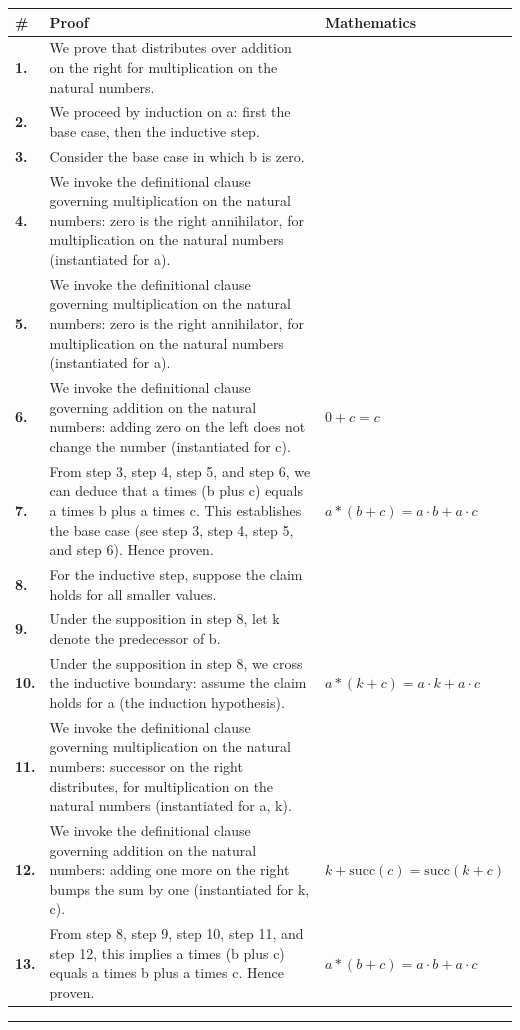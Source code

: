 \documentclass[11pt]{article}
\theoremstyle{definition}
\begin{document}
\begin{tabular}{@{} >{\raggedright\arraybackslash}p{} >{\raggedright\arraybackslash}p{} >{\raggedleft\arraybackslash}p{} @{}}
\textbf{\#} & \textbf{Proof} & \textbf{Mathematics} \\
\midrule
\textbf{1.} & We prove that distributes over addition on the right for multiplication on the natural numbers. & \\[0.45em]
\textbf{2.} & We proceed by induction on a: first the base case, then the inductive step. & \\[0.45em]
\textbf{3.} & Consider the base case in which b is zero. & \\[0.45em]
\textbf{4.} & We invoke the definitional clause governing multiplication on the natural numbers: zero is the right annihilator, for multiplication on the natural numbers (instantiated for a). & \\[0.45em]
\textbf{5.} & We invoke the definitional clause governing multiplication on the natural numbers: zero is the right annihilator, for multiplication on the natural numbers (instantiated for a). & \\[0.45em]
\textbf{6.} & We invoke the definitional clause governing addition on the natural numbers: adding zero on the left does not change the number (instantiated for c). & $\displaystyle 0 + c = c$ \\[0.45em]
\textbf{7.} & From step 3, step 4, step 5, and step 6, we can deduce that a times (b plus c) equals a times b plus a times c. This establishes the base case (see step 3, step 4, step 5, and step 6). Hence proven. & $\displaystyle a * (b + c) = a \cdot b + a \cdot c$ \\[0.45em]
\textbf{8.} & For the inductive step, suppose the claim holds for all smaller values. & \\[0.45em]
\textbf{9.} & Under the supposition in step 8, let k denote the predecessor of b. & \\[0.45em]
\textbf{10.} & Under the supposition in step 8, we cross the inductive boundary: assume the claim holds for a (the induction hypothesis). & $\displaystyle a * (k + c) = a \cdot k + a \cdot c$ \\[0.45em]
\textbf{11.} & We invoke the definitional clause governing multiplication on the natural numbers: successor on the right distributes, for multiplication on the natural numbers (instantiated for a, k). & \\[0.45em]
\textbf{12.} & We invoke the definitional clause governing addition on the natural numbers: adding one more on the right bumps the sum by one (instantiated for k, c). & $\displaystyle k + \mathrm{succ}(c) = \mathrm{succ}(k + c)$ \\[0.45em]
\textbf{13.} & From step 8, step 9, step 10, step 11, and step 12, this implies a times (b plus c) equals a times b plus a times c. Hence proven. & $\displaystyle a * (b + c) = a \cdot b + a \cdot c$ \\[0.45em]
\bottomrule
\end{tabular}
\label{thm:Nat-multiplication-distributes_over_addition_on_the_right}
\par\medskip\hrule
\end{document}
